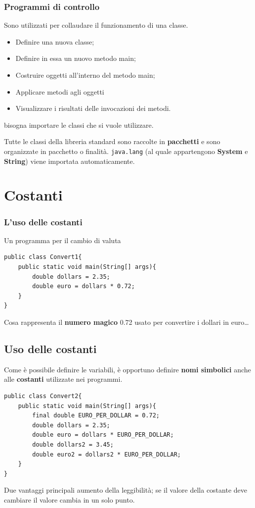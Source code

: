 \begin{frame}
\frametitle{Programmi di controllo}
Sono utilizzati per collaudare il funzionamento di una classe.
\begin{itemize}
\item Definire una nuova classe;
\item Definire in essa un nuovo metodo main;
\item Costruire oggetti all'interno del metodo main;
\item Applicare metodi agli oggetti
\item Visualizzare i risultati delle invocazioni dei metodi.
\end{itemize}
\alert{bisogna importare le classi che si vuole utilizzare.}
\begin{block}{}
Tutte le classi della libreria standard sono raccolte in \textbf{pacchetti} e sono organizzate in pacchetto o finalità. 
\texttt{java.lang} (al quale appartengono \textbf{System} e \textbf{String}) viene importata automaticamente.
\end{block}
\end{frame}

\section*{Costanti}
\begin{frame}[fragile]
\frametitle{L'uso delle costanti}
Un programma per il cambio di valuta
\begin{lstlisting}
public class Convert1{ 
    public static void main(String[] args){ 
	    double dollars = 2.35;
        double euro = dollars * 0.72;
    }
}
\end{lstlisting}
\begin{block}{}
Cosa rappresenta il \textbf{numero magico} \alert{0.72} usato per convertire i dollari in euro\ldots
\end{block}
\end{frame}
\subsection*{Uso delle costanti}
\begin{frame}[fragile]
Come è possibile definire le variabili, è opportuno definire \textbf{nomi simbolici} anche alle \textbf{costanti} utilizzate nei
programmi.
\begin{lstlisting}
public class Convert2{ 
    public static void main(String[] args){ 
        final double EURO_PER_DOLLAR = 0.72;
        double dollars = 2.35;
        double euro = dollars * EURO_PER_DOLLAR;
        double dollars2 = 3.45;
        double euro2 = dollars2 * EURO_PER_DOLLAR;
    }
}
\end{lstlisting}
\begin{block}{}
Due vantaggi principali \alert{aumento della leggibilità}; se il valore della costante deve cambiare il valore cambia in un solo 
punto.
\end{block}
\end{frame}

